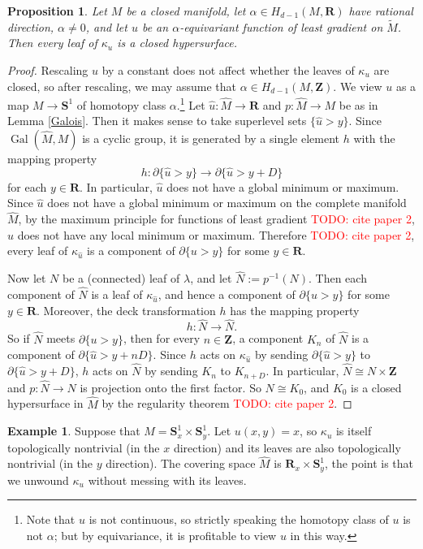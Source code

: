 \documentclass[reqno,11pt]{amsart}
\newcommand{\ZZ}{\mathbf{Z}}
\newcommand{\RR}{\mathbf{R}}
\newcommand{\Sph}{\mathbf S}
\DeclareMathOperator{\Gal}{Gal}
\newtheorem{proposition}[theorem]{Proposition}
\theoremstyle{definition}
\newtheorem{example}[theorem]{Example}
\numberwithin{equation}{section}
\newcommand\todo[1]{\textcolor{red}{TODO: #1}}
\begin{document}
\begin{proposition}
Let $M$ be a closed manifold, let $\alpha \in H_{d - 1}(M, \RR)$ have rational direction, $\alpha \neq 0$, and let $u$ be an $\alpha$-equivariant function of least gradient on $\tilde M$.
Then every leaf of $\kappa_u$ is a closed hypersurface.
\end{proposition}
\begin{proof}
Rescaling $u$ by a constant does not affect whether the leaves of $\kappa_u$ are closed, so after rescaling, we may assume that $\alpha \in H_{d - 1}(M, \ZZ)$.
We view $u$ as a map $M \to \Sph^1$ of homotopy class $\alpha$.\footnote{Note that $u$ is not continuous, so strictly speaking the homotopy class of $u$ is not $\alpha$; but by equivariance, it is profitable to view $u$ in this way.}
Let $\hat u: \hat M \to \RR$ and $p: \hat M \to M$ be as in Lemma \ref{Galois}.
Then it makes sense to take superlevel sets $\{\hat u > y\}$.
Since $\Gal(\hat M, M)$ is a cyclic group, it is generated by a single element $h$ with the mapping property
$$h: \partial \{\hat u > y\} \to \partial \{\hat u > y + D\}$$
for each $y \in \RR$.
In particular, $\hat u$ does not have a global minimum or maximum.
Since $\hat u$ does not have a global minimum or maximum on the complete manifold $\hat M$, by the maximum principle for functions of least gradient \todo{cite paper 2}, $\hat u$ does not have any local minimum or maximum.
Therefore \todo{cite paper 2}, every leaf of $\kappa_{\hat u}$ is a component of $\partial \{u > y\}$ for some $y \in \RR$.

Now let $N$ be a (connected) leaf of $\lambda$, and let $\hat N := p^{-1}(N)$.
Then each component of $\hat N$ is a leaf of $\kappa_{\hat u}$, and hence a component of $\partial \{u > y\}$ for some $y \in \RR$.
Moreover, the deck transformation $h$ has the mapping property
$$h: \hat N \to \hat N.$$
So if $\hat N$ meets $\partial \{u > y\}$, then for every $n \in \ZZ$, a component $K_n$ of $\hat N$ is a component of $\partial \{\hat u > y + nD\}$.
Since $h$ acts on $\kappa_{\hat u}$ by sending $\partial \{\hat u > y\}$ to $\partial \{\hat u > y + D\}$, $h$ acts on $\hat N$ by sending $K_n$ to $K_{n + D}$.
In particular, $\hat N \cong N \times \ZZ$ and $p: \hat N \to N$ is projection onto the first factor. 
So $N \cong K_0$, and $K_0$ is a closed hypersurface in $\hat M$ by the regularity theorem \todo{cite paper 2}.
\end{proof}

\begin{example}
Suppose that $M = \Sph^1_x \times \Sph^1_y$.
Let $u(x, y) = x$, so $\kappa_u$ is itself topologically nontrivial (in the $x$ direction) and its leaves are also topologically nontrivial (in the $y$ direction).
The covering space $\hat M$ is $\RR_x \times \Sph_y^1$, the point is that we unwound $\kappa_u$ without messing with its leaves.
\end{example}
\end{document}
